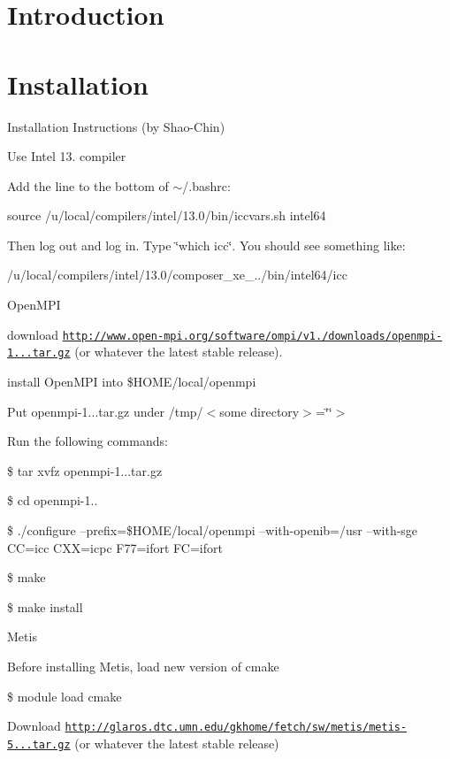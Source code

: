 \hypertarget{_p_i_l_Introduction}{}\section{Introduction}\label{_p_i_l_Introduction}
\hypertarget{_p_i_l_Installation}{}\section{Installation}\label{_p_i_l_Installation}
Installation Instructions (by Shao-\/\+Chin)


\begin{DoxyItemize}
\item Use Intel 13. compiler

Add the line to the bottom of $\sim$/.bashrc\+:

source /u/local/compilers/intel/13.0/bin/iccvars.\+sh intel64

Then log out and log in. Type \char`\"{}which icc\char`\"{}. You should see something like\+:

/u/local/compilers/intel/13.0/composer\+\_\+xe\+\_../bin/intel64/icc
\item Open\+M\+P\+I

download \href{http://www.open-mpi.org/software/ompi/v1.6/downloads/openmpi-1.6.3.tar.gz}{\tt http\+://www.\+open-\/mpi.\+org/software/ompi/v1./downloads/openmpi-\/1...\+tar.\+gz} (or whatever the latest stable release).

install Open\+M\+P\+I into \$\+H\+O\+M\+E/local/openmpi

Put openmpi-\/1...\+tar.\+gz under /tmp/$<$some directory$>$=\char`\"{}\char`\"{}$>$

Run the following commands\+:

\$ tar xvfz openmpi-\/1...\+tar.\+gz

\$ cd openmpi-\/1..

\$ ./configure --prefix=\$\+H\+O\+M\+E/local/openmpi --with-\/openib=/usr --with-\/sge C\+C=icc C\+X\+X=icpc F77=ifort F\+C=ifort

\$ make

\$ make install
\item Metis

Before installing Metis, load new version of cmake

\$ module load cmake

Download \href{http://glaros.dtc.umn.edu/gkhome/fetch/sw/metis/metis-5.0.2.tar.gz}{\tt http\+://glaros.\+dtc.\+umn.\+edu/gkhome/fetch/sw/metis/metis-\/5...\+tar.\+gz} (or whatever the latest stable release)


\end{DoxyItemize}
